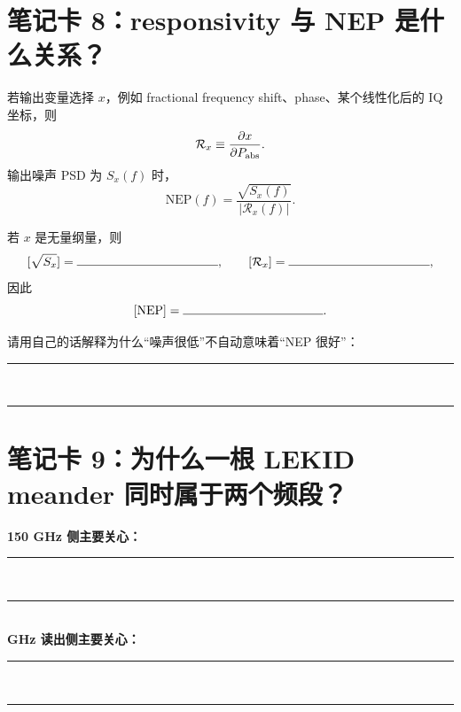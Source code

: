 \documentclass[11pt,a4paper,openany]{ctexrep}
\begin{document}
\section{笔记卡 8：responsivity 与 NEP 是什么关系？}

若输出变量选择 $x$，例如 fractional frequency shift、phase、某个线性化后的 IQ 坐标，则
\[
\mathcal R_x\equiv\frac{\partial x}{\partial P_{\rm abs}}.
\]
输出噪声 PSD 为 $S_x(f)$ 时，
\[
\boxed{
\mathrm{NEP}(f)
=
\frac{\sqrt{S_x(f)}}{|\mathcal R_x(f)|}
}.
\]

\begin{notebookbox}[title=单位检查]
若 $x$ 是无量纲量，则
\[
[\sqrt{S_x}]=\rule{4cm}{0.4pt},
\qquad
[\mathcal R_x]=\rule{4cm}{0.4pt},
\]
因此
\[
[\mathrm{NEP}]=\rule{4cm}{0.4pt}.
\]

请用自己的话解释为什么“噪声很低”不自动意味着“NEP 很好”：\\[0.8em]
\rule{0.96\linewidth}{0.4pt}\\[1.2em]
\rule{0.96\linewidth}{0.4pt}
\end{notebookbox}

\section{笔记卡 9：为什么一根 LEKID meander 同时属于两个频段？}

\begin{center}
\end{center}

\begin{notebookbox}[title=把两个频段分开写]
\textbf{150 GHz 侧主要关心：}\\[0.4em]
\rule{0.96\linewidth}{0.4pt}\\[1.1em]
\rule{0.96\linewidth}{0.4pt}\\[1.1em]

\textbf{GHz 读出侧主要关心：}\\[0.4em]
\rule{0.96\linewidth}{0.4pt}\\[1.1em]
\rule{0.96\linewidth}{0.4pt}
\end{notebookbox}
\end{document}
